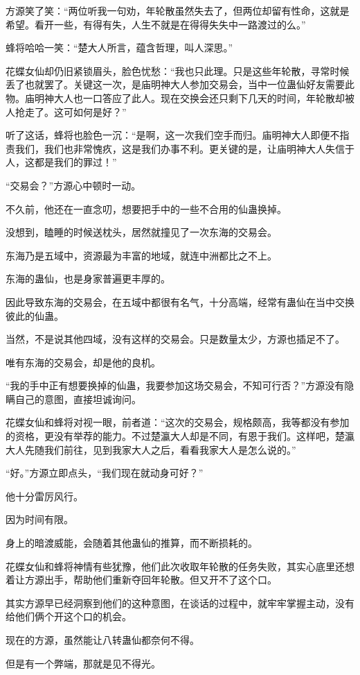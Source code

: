 \begin{this_body}
方源笑了笑：“两位听我一句劝，年轮散虽然失去了，但两位却留有性命，这就是希望。看开一些，有得有失，人生不就是在得得失失中一路渡过的么。”

蜂将哈哈一笑：“楚大人所言，蕴含哲理，叫人深思。”

花蝶女仙却仍旧紧锁眉头，脸色忧愁：“我也只此理。只是这些年轮散，寻常时候丢了也就罢了。关键这一次，是庙明神大人参加交易会，当中一位蛊仙好友需要此物。庙明神大人也一口答应了此人。现在交换会还只剩下几天的时间，年轮散却被人抢走了。这可如何是好？”

听了这话，蜂将也脸色一沉：“是啊，这一次我们空手而归。庙明神大人即便不指责我们，我们也非常愧疚，这是我们办事不利。更关键的是，让庙明神大人失信于人，这都是我们的罪过！”

“交易会？”方源心中顿时一动。

不久前，他还在一直念叨，想要把手中的一些不合用的仙蛊换掉。

没想到，瞌睡的时候送枕头，居然就撞见了一次东海的交易会。

东海乃是五域中，资源最为丰富的地域，就连中洲都比之不上。

东海的蛊仙，也是身家普遍更丰厚的。

因此导致东海的交易会，在五域中都很有名气，十分高端，经常有蛊仙在当中交换彼此的仙蛊。

当然，不是说其他四域，没有这样的交易会。只是数量太少，方源也插足不了。

唯有东海的交易会，却是他的良机。

“我的手中正有想要换掉的仙蛊，我要参加这场交易会，不知可行否？”方源没有隐瞒自己的意图，直接坦诚询问。

花蝶女仙和蜂将对视一眼，前者道：“这次的交易会，规格颇高，我等都没有参加的资格，更没有举荐的能力。不过楚瀛大人却是不同，有恩于我们。这样吧，楚瀛大人先随我们前往，见到我家大人之后，看看我家大人是怎么说的。”

“好。”方源立即点头，“我们现在就动身可好？”

他十分雷厉风行。

因为时间有限。

身上的暗渡威能，会随着其他蛊仙的推算，而不断损耗的。

花蝶女仙和蜂将神情有些犹豫，他们此次收取年轮散的任务失败，其实心底里还想着让方源出手，帮助他们重新夺回年轮散。但又开不了这个口。

其实方源早已经洞察到他们的这种意图，在谈话的过程中，就牢牢掌握主动，没有给他们俩个开这个口的机会。

现在的方源，虽然能让八转蛊仙都奈何不得。

但是有一个弊端，那就是见不得光。


\end{this_body}
